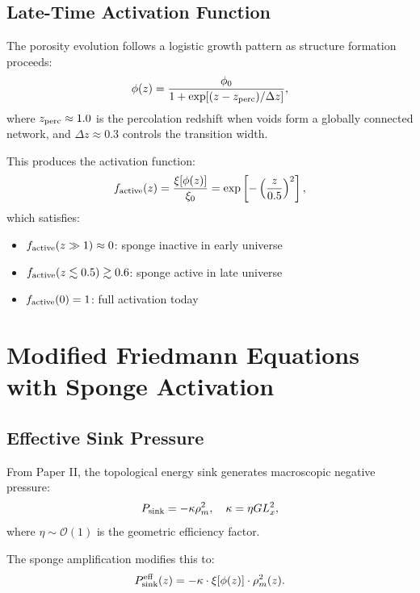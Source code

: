 \documentclass[12pt,a4paper]{article}
\begin{document}
\subsection{Late-Time Activation Function}

The porosity evolution follows a logistic growth pattern as structure formation proceeds:
\begin{equation}
\phi(z) = \frac{\phi_0}{1 + \exp[(z - z_{\rm perc})/\Delta z]},
\label{eq:phi_z}
\end{equation}
where $z_{\rm perc} \approx 1.0$ is the percolation redshift when voids form a globally connected network, and $\Delta z \approx 0.3$ controls the transition width.

This produces the activation function:
\begin{equation}
f_{\rm active}(z) = \frac{\xi[\phi(z)]}{\xi_0} = \exp\left[-\left(\frac{z}{0.5}\right)^2\right],
\label{eq:f_active}
\end{equation}
which satisfies:
\begin{itemize}
    \item $f_{\rm active}(z \gg 1) \approx 0$: sponge inactive in early universe
    \item $f_{\rm active}(z \lesssim 0.5) \gtrsim 0.6$: sponge active in late universe
    \item $f_{\rm active}(0) = 1$: full activation today
\end{itemize}

\section{Modified Friedmann Equations with Sponge Activation}

\subsection{Effective Sink Pressure}

From Paper II, the topological energy sink generates macroscopic negative pressure:
\begin{equation}
P_{\rm sink} = -\kappa \rho_m^2, \quad \kappa = \eta G L_x^2,
\end{equation}
where $\eta \sim \mathcal{O}(1)$ is the geometric efficiency factor.

The sponge amplification modifies this to:
\begin{equation}
P_{\rm sink}^{\rm eff}(z) = -\kappa \cdot \xi[\phi(z)] \cdot \rho_m^2(z).
\label{eq:P_sink_eff}
\end{equation}
\end{document}
